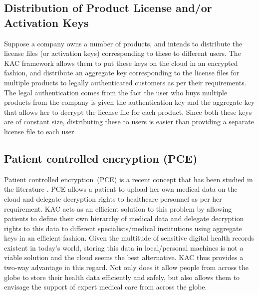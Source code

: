 \subsection*{Distribution of Product License and/or Activation Keys} Suppose a company owns a number of products, and intends to distribute the license files (or activation keys) corresponding to these to different users. The KAC framework allows them to put these keys on the cloud in an encrypted fashion, and distribute an aggregate key corresponding to the license files for multiple products to legally authenticated customers as per their requirements. The legal authentication comes from the fact the user who buys multiple products from the company is given the authentication key and the aggregate key that allows her to decrypt the license file for each product. Since both these keys are of constant size, distributing  these to users is easier than providing a separate license file to each user.

\subsection*{Patient controlled encryption (PCE)} Patient controlled encryption~(PCE) is a recent concept that has been studied in the literature \cite{benaloh2009patient}. PCE allows a patient to upload her own medical data on the cloud and delegate decryption rights to healthcare personnel as per her requirement. KAC acts as an efficient solution to this problem by allowing patients to define their own hierarchy of medical data and delegate decryption rights to this data to different specialists/medical institutions using aggregate keys in an efficient fashion. Given the multitude of sensitive digital health records existent in today's world, storing this data in local/personal machines is not a viable solution and the cloud seems the best alternative. KAC thus provides a two-way advantage in this regard. Not only does it allow people from across the globe to store their health data efficiently and safely, but also allows them to envisage the support of expert medical care from across the globe. 


